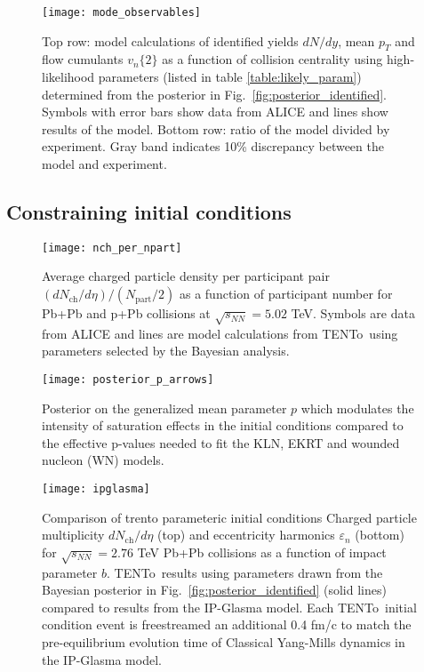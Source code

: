 \documentclass[aps,prc,reprint,amsmath]{revtex4-1}
\newcommand{\trento}{T\raisebox{-0.5ex}{R}ENTo}
\newcommand{\nch}{N_\text{ch}}
\newcommand{\npart}{N_\text{part}}
\newcommand{\sqrts}{\sqrt{s_{NN}}}
\begin{document}
\begin{figure*}
    \texttt{[image: mode\_observables]}
    \caption{Top row: model calculations of identified yields $dN/dy$, mean $p_T$ and flow cumulants $v_n\{2\}$ as a function of collision centrality using high-likelihood parameters (listed in table \ref{table:likely_param}) determined from the posterior in Fig.~\ref{fig:posterior_identified}. Symbols with error bars show data from ALICE and lines show results of the model. Bottom row: ratio of the model divided by experiment. Gray band indicates 10\% discrepancy between the model and experiment.}
    \label{fig:mode_observables}
\end{figure*}


\subsection{Constraining initial conditions}
\begin{figure}
    \texttt{[image: nch\_per\_npart]}
    \caption{Average charged particle density per participant pair $(d\nch/d\eta)/(\npart/2)$ as a function of participant number for Pb+Pb and p+Pb collisions at $\sqrts=5.02$ TeV.
    Symbols are data from ALICE and lines are model calculations from \protect\trento\ using parameters selected by the Bayesian analysis.}
\end{figure}

\begin{figure}
    \centering
    \texttt{[image: posterior\_p\_arrows]}
    \caption{Posterior on the generalized mean parameter $p$ which modulates the intensity of saturation effects in the initial conditions compared to the effective p-values needed to fit
    the KLN, EKRT and wounded nucleon (WN) models.}
    \label{posterior_p_arrows}
\end{figure}

\begin{figure}
    \centering
    \texttt{[image: ipglasma]}
    \caption{Comparison of trento parameteric initial conditions
    Charged particle multiplicity $d\nch/d\eta$ (top) and eccentricity harmonics $\varepsilon_n$ (bottom) for ${\sqrt{s_{NN}}=2.76}$ TeV Pb+Pb collisions as a function of impact parameter $b$. \protect\trento\ results using parameters drawn from the Bayesian posterior in Fig.~\ref{fig:posterior_identified} (solid lines) compared to results from the IP-Glasma model. Each \protect\trento\ initial condition event is freestreamed an additional 0.4 fm/c to match the pre-equilibrium evolution time of Classical Yang-Mills dynamics in the IP-Glasma model.}
\end{figure}
\end{document}
